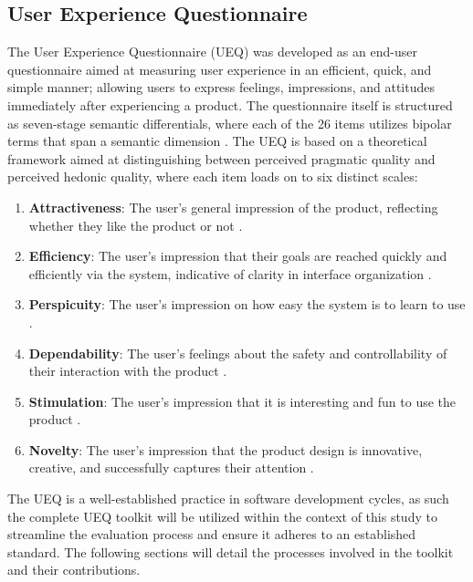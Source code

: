 \documentclass[11pt,a4paper,titlepage]{article}
\begin{document}
	\subsection{User Experience Questionnaire}
	The User Experience Questionnaire (UEQ) was developed as an end-user questionnaire aimed at measuring user experience in an efficient, quick, and simple manner; allowing users to express feelings, impressions, and attitudes immediately after experiencing a product. The questionnaire itself is structured as seven-stage semantic differentials, where each of the 26 items utilizes bipolar terms that span a semantic dimension \cite{laugwitz_2008_construction}. The UEQ is based on a theoretical framework aimed at distinguishing between perceived pragmatic quality and perceived hedonic quality, where each item loads on to six distinct scales: 
	\begin{enumerate}
		\item \textbf{Attractiveness}: The user's general impression of the product, reflecting whether they like the product or not \cite{laugwitz_2008_construction}.
		\item \textbf{Efficiency}: The user's impression that their goals are reached quickly and efficiently via the system, indicative of clarity in interface organization \cite{laugwitz_2008_construction}. 
		\item \textbf{Perspicuity}: The user's impression on how easy the system is to learn to use \cite{laugwitz_2008_construction}.
		\item \textbf{Dependability}: The user's feelings about the safety and controllability of their interaction with the product \cite{laugwitz_2008_construction}. 
		\item \textbf{Stimulation}: The user's impression that it is interesting and fun to use the product \cite{laugwitz_2008_construction}. 
		\item \textbf{Novelty}: The user's impression that the product design is innovative, creative, and successfully captures their attention \cite{laugwitz_2008_construction}. 
	\end{enumerate}
	
	The UEQ is a well-established practice in software development cycles, as such the complete UEQ toolkit \cite{hinderks_user} will be utilized within the context of this study to streamline the evaluation process and ensure it adheres to an established standard. The following sections will detail the processes involved in the toolkit and their contributions.
	
\end{document}

